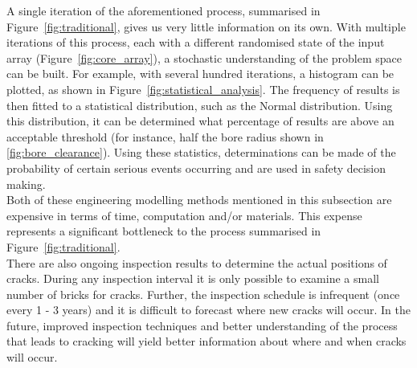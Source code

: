 \noindent
A single iteration of the aforementioned process, summarised in Figure~\ref{fig:traditional}, gives us very little information on its own. With multiple iterations of this process, each with a different randomised state of the input array (Figure~\ref{fig:core_array}), a stochastic  understanding of the problem space can be built. For example, with several hundred iterations, a histogram can be plotted, as shown in Figure~\ref{fig:statistical_analysis}. The frequency of results is then fitted to a statistical distribution, such as the Normal distribution. Using this distribution, it can be determined what percentage of results are above an acceptable threshold (for instance, half the bore radius shown in \ref{fig:bore_clearance}). Using these statistics, determinations can be made of the probability of certain serious events occurring and are used in safety decision making.\\



\noindent
Both of these engineering modelling methods mentioned in this subsection are expensive in terms of time, computation and/or materials. This expense represents a significant bottleneck to the process summarised in Figure~\ref{fig:traditional}.\\

\noindent
There are also ongoing inspection results to determine the actual positions of cracks. During any inspection interval it is only possible to examine a small number of bricks for cracks. Further, the inspection schedule is infrequent (once every 1 - 3 years) and it is difficult to forecast where new cracks will occur. In the future, improved inspection techniques and better understanding of the process that leads to cracking will yield better information about where and when cracks will occur.

